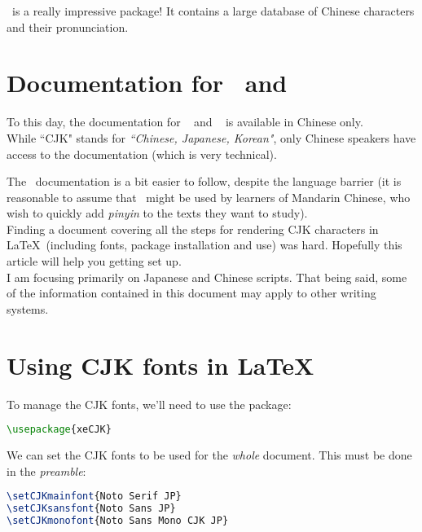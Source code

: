 \xxpinyin\ is a really impressive package! It contains a large database of Chinese characters and their pronunciation. \\


\newpage

\section*{Documentation for \xeCJK\ and \xxpinyin}

To this day, the documentation for \xeCJK\ \citep{xecjk} and \xxpinyin\ \citep{xpinyin} is available in Chinese only. \\

While ``CJK" stands for \emph{``Chinese, Japanese, Korean"}, only Chinese speakers have access to the documentation (which is very technical).

The \xxpinyin\ documentation is a bit easier to follow, despite the language barrier (it is reasonable to assume that \xxpinyin\ might be used by learners of Mandarin Chinese, who wish to quickly add \emph{pinyin} to the texts they want to study). \\

Finding a document covering all the steps for rendering CJK characters in \LaTeX\ (including fonts, package installation and use) was hard. Hopefully this article will help you getting set up. \\

I am focusing primarily on Japanese and Chinese scripts. That being said, some of the information contained in this document may apply to other writing systems. \\


\newpage

\section*{Using CJK fonts in \LaTeX}

To manage the CJK fonts, we'll need to use the  package:
\begin{lstlisting}[language=tex]
\usepackage{xeCJK}
\end{lstlisting}

We can set the CJK fonts to be used for the \emph{whole} document. This must be done in the \emph{preamble}:
\begin{lstlisting}[language=tex]
\setCJKmainfont{Noto Serif JP}
\setCJKsansfont{Noto Sans JP}
\setCJKmonofont{Noto Sans Mono CJK JP}
\end{lstlisting}

